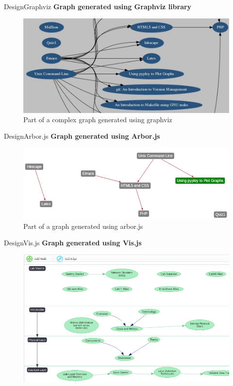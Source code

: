 \documentclass[xcolor=table]{beamer}
\begin{document}
\begin{frame}{Design}{Graphviz}
\textbf{Graph generated using Graphviz library}
	\begin{figure}
		\centering
		\includegraphics[width=0.8\linewidth]{media/Graphviz}
		\caption{Part of a complex graph generated using graphviz}
		\label{fig:Graphviz}
	\end{figure}
\end{frame}

\begin{frame}{Design}{Arbor.js}
\textbf{Graph generated using Arbor.js}
	\begin{figure}
		\centering
		\includegraphics[width=0.8\linewidth]{media/PrereqGraph}
		\caption{Part of a graph generated using arbor.js}
		\label{fig:PrereqGraph}
	\end{figure}
\end{frame}

\begin{frame}{Design}{Vis.js}
\textbf{Graph generated using Vis.js}
	\begin{figure}
		\centering
		\includegraphics[width=0.8\linewidth]{media/vis_js}
		\label{fig:vis_js}
	\end{figure}
\end{frame}
\end{document}
